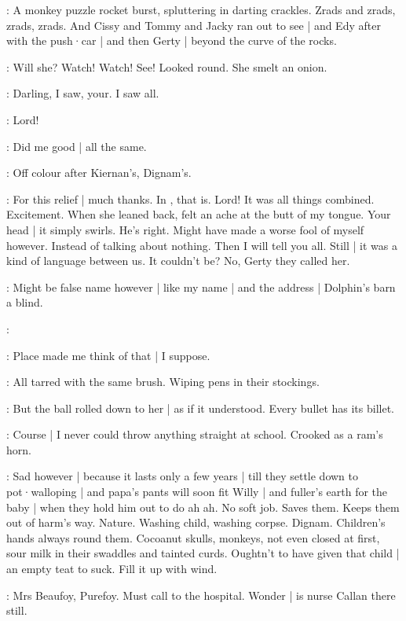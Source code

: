 :
A monkey puzzle rocket burst,
spluttering in darting crackles.
Zrads and zrads,
zrads,
zrads.
And Cissy and Tommy and Jacky ran out to see |
and Edy after with the push·car |
and then Gerty |
beyond the curve of the rocks.

\BloomInt:
Will she?
Watch!
Watch!
See!
Looked round.
She smelt an onion.

\BloomAbstract:
Darling,
I saw,
your.
I saw all.

\BloomInt:
Lord!

\BloomCurrent:
Did me good |
all the same.

\BloomToday:
Off colour after Kiernan's,
Dignam's.

\BloomCurrent:
For this relief |
much thanks.
In ,
that is.%
Lord!
It was all things combined.
Excitement.
When she leaned back,
felt an ache at the butt of my tongue.
Your head |
it simply swirls.
He's right.
Might have made a worse fool of myself however.
Instead of talking about nothing.
Then I will tell you all.
Still |
it was a kind of language between us.
It couldn't be?
No,
Gerty they called her.

\BloomToday:
Might be false name however |
like my name |
and the address |
Dolphin's barn a blind.

:

\BloomCurrent:
Place made me think of that |
I suppose.

\BloomAbstract:
All tarred with the same brush.
Wiping pens in their stockings.%

\BloomCurrent:
But the ball rolled down to her |
as if it understood.
Every bullet has its billet.

\BloomHist:
Course |
I never could throw anything straight at school.
Crooked as a ram's horn.

\BloomAbstract:
Sad however |
because it lasts only a few years |
till they settle down to pot·walloping |
and papa's pants will soon fit Willy |
and fuller's earth for the baby |
when they hold him out to do ah ah.
No soft job.
Saves them.
Keeps them out of harm's way.
Nature.
Washing child,
washing corpse.
Dignam.
Children's hands always round them.
Cocoanut skulls,
monkeys,
not even closed at first,
sour milk in their swaddles and tainted curds.
Oughtn't to have given that child |
an empty teat to suck.
Fill it up with wind.

\BloomToday:
Mrs Beaufoy,
Purefoy.
Must call to the hospital.
Wonder |
is nurse Callan there still.%

